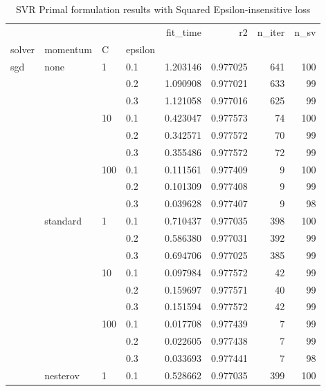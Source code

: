 \begin{table}[H]
\centering
\caption{SVR Primal formulation results with Squared Epsilon-insensitive loss}
\label{primal_svr_squared_eps_cv_results}
\begin{tabular}{llllrrrr}
\toprule
          &   &     &     &  fit\_time &        r2 &  n\_iter &  n\_sv \\
solver & momentum & C & epsilon &           &           &         &       \\
\midrule
sgd & none & 1   & 0.1 &  1.203146 &  0.977025 &     641 &   100 \\
          &   &     & 0.2 &  1.090908 &  0.977021 &     633 &    99 \\
          &   &     & 0.3 &  1.121058 &  0.977016 &     625 &    99 \\
          &   & 10  & 0.1 &  0.423047 &  0.977573 &      74 &   100 \\
          &   &     & 0.2 &  0.342571 &  0.977572 &      70 &    99 \\
          &   &     & 0.3 &  0.355486 &  0.977572 &      72 &    99 \\
          &   & 100 & 0.1 &  0.111561 &  0.977409 &       9 &   100 \\
          &   &     & 0.2 &  0.101309 &  0.977408 &       9 &    99 \\
          &   &     & 0.3 &  0.039628 &  0.977407 &       9 &    98 \\
          & standard & 1   & 0.1 &  0.710437 &  0.977035 &     398 &   100 \\
          &   &     & 0.2 &  0.586380 &  0.977031 &     392 &    99 \\
          &   &     & 0.3 &  0.694706 &  0.977025 &     385 &    99 \\
          &   & 10  & 0.1 &  0.097984 &  0.977572 &      42 &    99 \\
          &   &     & 0.2 &  0.159697 &  0.977571 &      40 &    99 \\
          &   &     & 0.3 &  0.151594 &  0.977572 &      42 &    99 \\
          &   & 100 & 0.1 &  0.017708 &  0.977439 &       7 &    99 \\
          &   &     & 0.2 &  0.022605 &  0.977438 &       7 &    99 \\
          &   &     & 0.3 &  0.033693 &  0.977441 &       7 &    98 \\
          & nesterov & 1   & 0.1 &  0.528662 &  0.977035 &     399 &   100 \\

\end{tabular}
\end{table}
